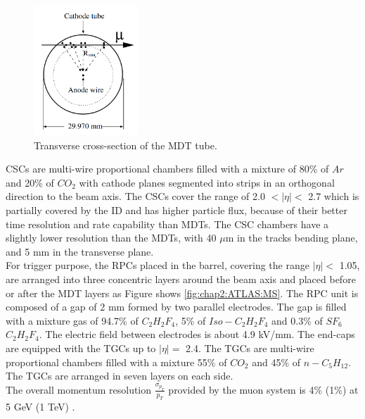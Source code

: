 \begin{figure}[htbp]
    \centering
    \includegraphics[width=0.35\textwidth]{Ch2/Img/Tube.png}
    \caption{Transverse cross-section of the MDT tube.}
    \label{fig:chap2:ATLAS:MS:Tube}
\end{figure}
CSCs are multi-wire proportional chambers filled with a mixture of 80\% of $Ar$ and 20\% of $CO_2$ with cathode planes segmented into strips in an orthogonal direction to the beam axis. The CSCs cover the range of 2.0 $ < |\eta| < $ 2.7 which is partially covered by the ID and has higher particle flux, because of their better time resolution and rate capability than MDTs. The CSC chambers have a slightly lower resolution than the MDTs, with 40 $\mu$m in the tracks bending plane, and 5 mm in the transverse plane. \\
For trigger purpose, the RPCs placed in the barrel, covering the range $|\eta| < $ 1.05,  are arranged into three concentric layers around the beam axis and placed before or after the MDT layers as Figure shows \ref{fig:chap2:ATLAS:MS}. The RPC unit is composed of a gap of 2 mm formed by two parallel electrodes. The gap is filled with a mixture gas of 94.7\% of $C_2H_2F_4$, 5\% of $Iso-C_2H_2F_4$ and 0.3\% of $SF_6$ $C_2H_2F_4$. The electric field between electrodes is about 4.9 kV/mm. The end-caps are equipped with the TGCs up to $|\eta| = $ 2.4. The TGCs are multi-wire proportional chambers filled with a mixture 55\% of $CO_2$ and 45\% of $n-C_5H_{12}$. The TGCs are arranged in seven layers on each side.\\
The overall momentum resolution $\frac{\sigma_{p_T}}{p_T}$ provided by the muon system is 4\% (1\%) at 5 GeV (1 TeV) \cite{ATLAS_Perf}.

